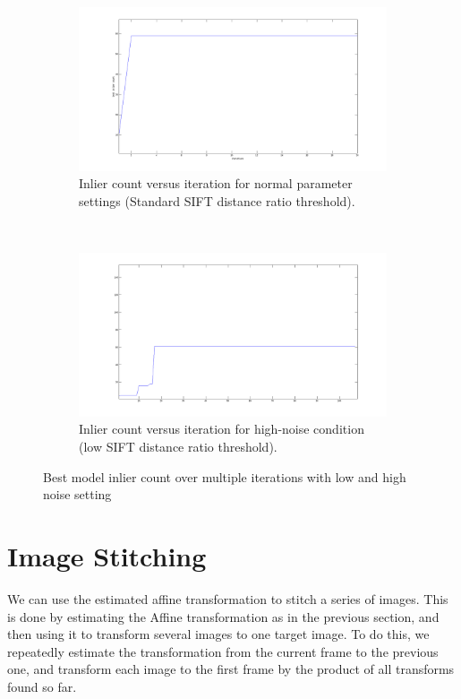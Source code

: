 \documentclass[a4paper,10pt]{article}
\begin{document}
\begin{figure}

        \centering
        \begin{subfigure}[b]{0.475\textwidth}
                \centering
                \includegraphics[width=\textwidth]{img/inliercount}
                \caption{Inlier count versus iteration for normal parameter settings (Standard SIFT distance ratio threshold).}
        \end{subfigure}
        ~
        \begin{subfigure}[b]{0.475\textwidth}
                \centering
                \includegraphics[width=\textwidth]{img/inliercount_11}
                \caption{Inlier count versus iteration for high-noise condition (low SIFT distance ratio threshold).}
        \end{subfigure}
\caption{Best model inlier count over multiple iterations with low and high noise setting}
\label{fig:inliercount}      
\end{figure}

\section{Image Stitching}
We can use the estimated affine transformation to stitch a series of images.
This is done by estimating the Affine transformation as in the previous section, and then using it to transform several images to one target image.
To do this, we repeatedly estimate the transformation from the current frame to the previous one, and transform each image to the first frame by the product of all transforms found so far.
\end{document}
